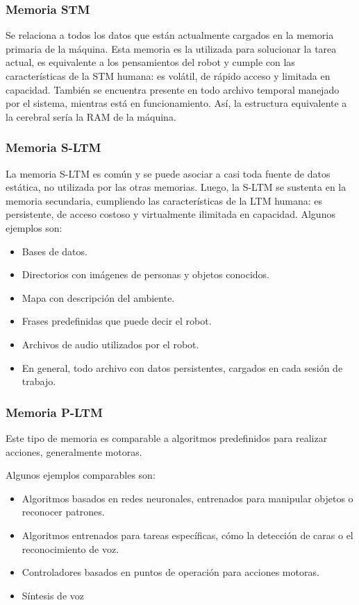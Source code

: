 \subsubsection{Memoria STM}

Se relaciona a todos los datos que est\'an actualmente cargados en la memoria primaria de la m\'aquina. Esta memoria es la utilizada para solucionar la tarea actual, es equivalente a los pensamientos del robot y cumple con las caracter\'isticas de la STM humana: es volátil, de r\'apido acceso y limitada en capacidad. Tambi\'en se encuentra presente en todo archivo temporal manejado por el sistema, mientras est\'a en funcionamiento. As\'i, la estructura equivalente a la cerebral ser\'ia la RAM de la m\'aquina.


\subsubsection{Memoria S-LTM}

La memoria S-LTM es com\'un y se puede asociar a casi toda fuente de datos est\'atica, no utilizada por las otras memorias. Luego, la S-LTM se sustenta en la memoria secundaria, cumpliendo las caracter\'isticas de la LTM humana: es persistente, de acceso costoso y virtualmente ilimitada en capacidad. Algunos ejemplos son:
\begin{itemize}[topsep=0pt]
\setlength\itemsep{0.2em}
\item Bases de datos.
\item Directorios con im\'agenes de personas y objetos conocidos.
\item Mapa con descripci\'on del ambiente.
\item Frases predefinidas que puede decir el robot.
\item Archivos de audio utilizados por el robot.
\item En general, todo archivo con datos persistentes, cargados en cada sesi\'on de trabajo.
\end{itemize}


\subsubsection{Memoria P-LTM}

Este tipo de memoria es comparable a algoritmos predefinidos para realizar acciones, generalmente motoras. 

Algunos ejemplos comparables son: 
\begin{itemize}[topsep=0pt]
\setlength\itemsep{0.2em}
\item Algoritmos basados en redes neuronales, entrenados para manipular objetos o reconocer patrones.
\item Algoritmos entrenados para tareas espec\'ificas, c\'omo la detecci\'on de caras o el reconocimiento de voz.
\item Controladores basados en puntos de operaci\'on para acciones motoras.
\item S\'intesis de voz
\end{itemize}

